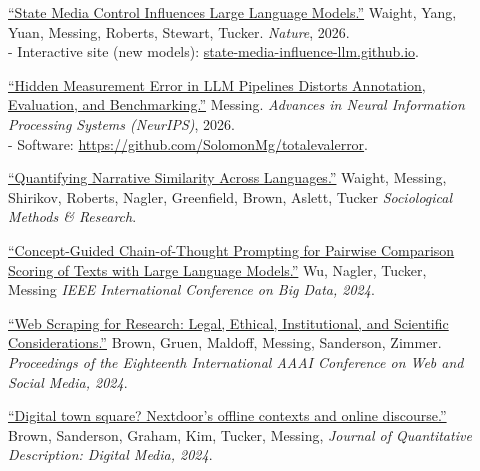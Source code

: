 \documentclass[letterpaper,11pt]{article}
\newcommand{\resheading}[1]{\vspace{4pt}{\large
\colorbox{mygrey}{\begin{minipage}{\textwidth}{\textbf{#1
\vphantom{p\^{E}}}}\end{minipage}}}\vspace{4pt}}
\begin{document}
\resheading{Publications}
\begin{description}

\item[] \href{https://doi.org/10.1038/s41586-026-10506-7}{``State Media Control Influences Large Language Models.''}  Waight, Yang, Yuan, Messing, Roberts, Stewart, Tucker.
\emph{Nature}, 2026. \\
- Interactive site (new models): \href{https://state-media-influence-llm.github.io}{state-media-influence-llm.github.io}. \\

\item[] \href{https://arxiv.org/abs/2604.11581}{``Hidden Measurement Error in LLM Pipelines Distorts Annotation, Evaluation, and Benchmarking.''}  Messing.
\emph{Advances in Neural Information Processing Systems (NeurIPS)}, 2026. \\
- Software: \url{https://github.com/SolomonMg/totalevalerror}. \\

\item[] \href{https://solomonmg.github.io/pdf/Quantifying_Narrative_Similarity_Across_Languages.pdf}{``Quantifying Narrative Similarity Across Languages.''}  Waight, Messing, Shirikov, Roberts, Nagler, Greenfield, Brown, Aslett, Tucker
\emph{Sociological Methods \& Research}. \\

\item[] \href{https://ieeexplore.ieee.org/document/10825235}{``Concept-Guided Chain-of-Thought Prompting for Pairwise Comparison Scoring of Texts with Large Language Models.''} Wu, Nagler, Tucker, Messing
\emph{IEEE International Conference on Big Data, 2024}. \\ 

\item[] \href{https://arxiv.org/abs/2410.23432}{``Web Scraping for Research: Legal, Ethical, Institutional, and Scientific Considerations.''}   Brown, Gruen, Maldoff, Messing, Sanderson, Zimmer.
\emph{Proceedings of the Eighteenth International AAAI Conference on Web and Social Media, 2024}. \\ 


\item[] \href{https://journalqd.org/article/view/5891}{``Digital town square? Nextdoor's offline contexts and online discourse.''}   Brown, Sanderson, Graham, Kim, Tucker, Messing,
\emph{Journal of Quantitative Description: Digital Media, 2024}. \\ 



\end{description}
\end{document}
